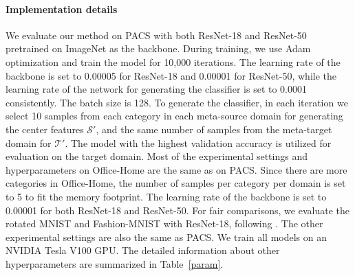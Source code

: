 \documentclass{article} \usepackage[table]{xcolor}
\begin{document}
\paragraph{Implementation details}
We evaluate our method on PACS with both ResNet-18 and ResNet-50 \citep{he2016deep} pretrained on ImageNet \citep{deng2009imagenet} as the backbone.
During training, we use Adam optimization and train the model for 10,000 iterations. 
The learning rate of the backbone is set to 0.00005 for ResNet-18 and 0.00001 for ResNet-50, while the learning rate of the network for generating the classifier is set to 0.0001 consistently.
The batch size is 128. To generate the classifier, in each iteration we select 10 samples from each category in each meta-source domain for generating the center features $\mathcal{S'}$, and the same number of samples from the meta-target domain for $\mathcal{T'}$. The model with the highest validation accuracy is utilized for evaluation on the target domain.
Most of the experimental settings and hyperparameters on Office-Home are the same as on PACS. Since there are more categories in Office-Home, the number of samples per category per domain is set to 5 to fit the memory footprint.
The learning rate of the backbone is set to 0.00001 for both ResNet-18 and ResNet-50.
For fair comparisons, we evaluate the rotated MNIST and Fashion-MNIST with ResNet-18, following \citep{piratla2020efficient}.
The other experimental settings are also the same as PACS.
We train all models 
on an NVIDIA Tesla V100 GPU. 
The detailed information about other hyperparameters are summarized in Table~\ref{param}.




\begin{table}[t]
\caption{\textbf{Implementation details of our method per dataset and backbone.} ``Number of source samples'' denotes the number of samples per class per source domain for generating the adapted classifier. 
}
\centering
\label{param}
\end{table}
\end{document}
